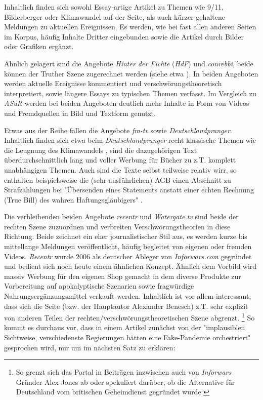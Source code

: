 Inhaltlich finden sich sowohl Essay-artige Artikel zu Themen wie 9/11, Bilderberger oder Klimawandel auf der Seite, als auch kürzer gehaltene Meldungen zu aktuellen Ereignissen.
Es werden, wie bei fast allen anderen Seiten im Korpus, häufig Inhalte Dritter eingebunden sowie die Artikel durch Bilder oder Grafiken ergänzt.

Ähnlich gelagert sind die Angebote \textit{Hinter der Fichte} (\textit{HdF}) und \textit{conrebbi}, beide können der Truther Szene zugerechnet werden (siehe etwa \cite{psiram-conrebbi}).
In beiden Angeboten werden aktuelle Ereignisse kommentiert und verschwörungstheoretisch interpretiert, sowie längere Essays zu typischen Themen verfasst.
Im Vergleich zu \textit{ASuR} werden bei beiden Angeboten deutlich mehr Inhalte in Form von Videos und Fremdquellen in Bild und Textform genutzt.

Etwas aus der Reihe fallen die Angebote \textit{fm-tv} sowie \textit{Deutschlandpranger}.
Inhaltlich finden sich etwa beim \textit{Deutschlandpranger} recht klassische Themen wie die Leugnung des Klimawandels \parencite*[vgl.][]{dprang-klima}, sind die dazugehörigen Text überdurchschnittlich lang und voller Werbung für Bücher zu z.T. komplett unabhängigen Themen.
Auch sind die Texte selbst teilweise relativ wirr, so enthalten beispielsweise die (sehr ausführlichen) AGB einen Abschnitt zu Strafzahlungen bei "Übersenden eines Statements anstatt einer echten Rechnung (True Bill) des wahren Haftungsgläubigers" \parencite*{dprang-agb}.

Die verbleibenden beiden Angebote \textit{recentr} und \textit{Watergate.tv} sind beide der rechten Szene zuzuordnen und verbreiten Verschwörungstheorien in diese Richtung.
Beide zeichnet ein eher journalistischer Stil aus, es werden kurze bis mittellange Meldungen veröffentlicht, häufig begleitet von eigenen oder fremden Videos.
\textit{Recentr} wurde 2006 als deutscher Ableger von \textit{Inforwars.com} gegründet und bedient sich noch heute einem ähnlichen Konzept.
Ähnlich dem Vorbild wird massiv Werbung für den eigenen Shop gemacht in dem diverse Produkte zur Vorbereitung auf apokalyptische Szenarien sowie fragwürdige Nahrungsergänzungsmittel verkauft werden.
Inhaltlich ist vor allem interessant, dass sich die Seite (bzw. der Hauptautor Alexander Benesch) z.T. sehr explizit von anderen Teilen der rechten/verschwörungstheoretischen Szene abgrenzt.
\footnote{So grenzt sich das Portal in Beiträgen inzwischen auch von \textit{Inforwars} Gründer Alex Jones ab \parencite*{recentr-jones} oder spekuliert darüber, ob die Alternative für Deutschland vom britischen Geheimdienst gegründet wurde \parencite{recentr-afd}}
So kommt es durchaus vor, dass in einem Artikel zunächst von der "implausiblen Sichtweise, verschiedenste Regierungen hätten eine Fake-Pandemie orchestriert" \parencite{recentr-population} gesprochen wird, nur um im nächsten Satz zu erklären: 

